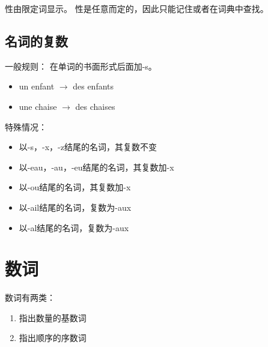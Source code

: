 性由限定词显示。
性是任意而定的，因此只能记住或者在词典中查找。


\subsection{名词的复数}

一般规则：
在单词的书面形式后面加-s。

\begin{itemize}
\item un enfant $\rightarrow$ des enfants
\item une chaise $\rightarrow$ des chaises
\end{itemize}


特殊情况：
\begin{itemize}
\item 以-s，-x，-z结尾的名词，其复数不变
\item 以-eau，-au，-eu结尾的名词，其复数加-x
\item 以-ou结尾的名词，其复数加-x
\item 以-ail结尾的名词，复数为-aux
\item 以-al结尾的名词，复数为-aux
\end{itemize}


\section{数词}

数词有两类：
\begin{enumerate}
\item 指出数量的基数词
\item 指出顺序的序数词
\end{enumerate}


